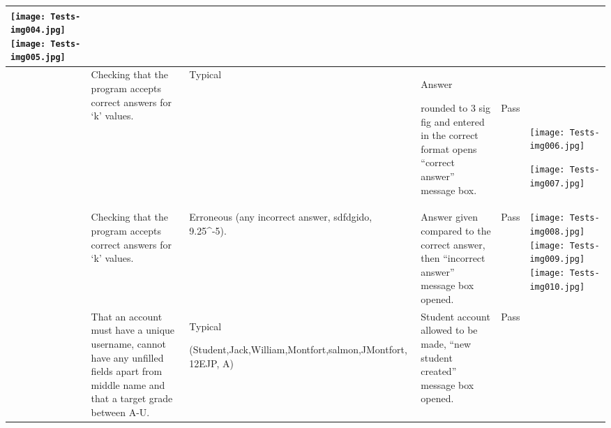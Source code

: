 \documentclass[a4paper,landscape,10pt]{article}
\begin{document}
\begin{flushleft}
\begin{supertabular}{|m{1.1899999cm}|m{2.294cm}|m{2.294cm}|m{3cm}|m{1.305cm}|m{15.190001cm}|}
{\fontsize{11pt}{13.2pt}\selectfont  \texttt{[image: Tests-img004.jpg]}
   \texttt{[image: Tests-img005.jpg]}
 }\\\hline
{\fontsize{11pt}{13.2pt}} &
{\fontsize{11pt}{13.2pt}\selectfont Checking that the program accepts correct answers for `k' values.} &
{\fontsize{11pt}{13.2pt}\selectfont Typical} &
{\fontsize{11pt}{13.2pt}\selectfont Answer}

{\fontsize{11pt}{13.2pt}\selectfont rounded to 3 sig fig and entered in the correct format opens ``correct answer'' message box.} &
{\fontsize{11pt}{13.2pt}\selectfont ~}

{\fontsize{11pt}{13.2pt}\selectfont Pass} &
{\fontsize{11pt}{13.2pt}\selectfont ~}

{\fontsize{11pt}{13.2pt}\selectfont ~}

{\fontsize{11pt}{13.2pt}\selectfont   \texttt{[image: Tests-img006.jpg]}
 }

{\fontsize{11pt}{13.2pt}\selectfont \texttt{[image: Tests-img007.jpg]}
 }\\\hline
{\fontsize{11pt}{13.2pt}} &
{\fontsize{11pt}{13.2pt}\selectfont Checking that the program accepts correct answers for `k' values.} &
{\fontsize{11pt}{13.2pt}\selectfont Erroneous (any incorrect answer, sdfdgido, 9.25\^{}-5).} &
{\fontsize{11pt}{13.2pt}\selectfont Answer given compared to the correct answer, then ``incorrect answer'' message box opened.} &
{\fontsize{11pt}{13.2pt}\selectfont Pass} &
{\fontsize{11pt}{13.2pt}\selectfont \texttt{[image: Tests-img008.jpg]}\\
\texttt{[image: Tests-img009.jpg]}
   \texttt{[image: Tests-img010.jpg]}
 }\\\hline
{\fontsize{11pt}{13.2pt}} &
{\fontsize{11pt}{13.2pt}\selectfont That an account must have a unique username, cannot have any unfilled fields apart from middle name and that a target grade between A-U.} &
{\fontsize{11pt}{13.2pt}\selectfont Typical}

{\fontsize{11pt}{13.2pt}\selectfont (Student,Jack,William,Montfort,salmon,JMontfort, 12EJP, A)} &
{\fontsize{11pt}{13.2pt}\selectfont Student account allowed to be made, ``new student created'' message box opened.} &
{\fontsize{11pt}{13.2pt}\selectfont Pass} &
{\fontsize{11pt}{13.2pt}\selectfont ~}


\end{supertabular}
\end{flushleft}
\end{document}
